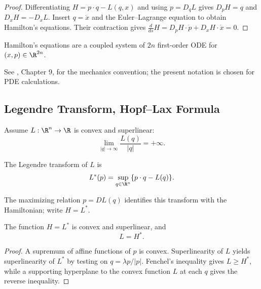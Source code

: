\begin{proof}
\sketch Differentiating $H=p\cdot q-L(q,x)$ and using $p=D_qL$ gives
$D_pH=q$ and $D_xH=-D_xL$. Insert $q=\dot x$ and the Euler--Lagrange
equation to obtain Hamilton's equations. Their contraction gives
$\frac d{ds}H=D_pH\cdot\dot p+D_xH\cdot\dot x=0$.
\end{proof}

\begin{remark}
\label{rem:hamiltons-ode-system-structure}
Hamilton's equations are a coupled system of $2n$ first-order ODE for
$(x,p)\in\R^{2n}$.
\end{remark}

\begin{remark}
\label{rem:arnold-mechanics-notation}
See \cite{Arnold1986}, Chapter 9, for the mechanics convention; the present
notation is chosen for PDE calculations.
\end{remark}

\subsection{Legendre Transform, Hopf--Lax Formula}
\label{sec:legendre-transform-hopf-lax}

Assume $L:\R^n\to\R$ is convex and superlinear:
\[
\lim_{|q|\to\infty}\frac{L(q)}{|q|}=+\infty.
\]

\begin{definition}
\label{def:legendre-transform}
The Legendre transform of $L$ is
\[
L^*(p)=\sup_{q\in\R^n}\{p\cdot q-L(q)\}.
\]
\end{definition}

The maximizing relation $p=DL(q)$ identifies this transform with the
Hamiltonian; write $H=L^*$.

\begin{theorem}
\label{thm:convex-duality-hamiltonian-lagrangian}
The function $H=L^*$ is convex and superlinear, and
\[
L=H^*.
\]
\end{theorem}

\begin{proof}
\sketch A supremum of affine functions of $p$ is convex. Superlinearity of
$L$ yields superlinearity of $L^*$ by testing on $q=\lambda p/|p|$.
Fenchel's inequality gives $L\ge H^*$, while a supporting hyperplane to the
convex function $L$ at each $q$ gives the reverse inequality.
\end{proof}


